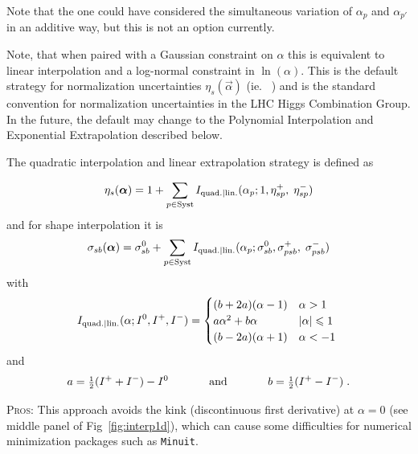 Note that the one could have considered the simultaneous variation of $\alpha_{p}$ and $\alpha_{p'}$ in an additive way, but this is not an option currently.

Note, that when paired with a Gaussian constraint on $\alpha$ this is equivalent to  linear interpolation and a log-normal constraint in $\ln(\alpha)$.  This is the default strategy for normalization uncertainties $\eta_{s}(\vec{\alpha})$ (ie. \OS\ ) and is the standard convention for normalization uncertainties in the LHC Higgs Combination Group.  In the future, the default may change to the Polynomial Interpolation and Exponential Extrapolation described below.


The quadratic interpolation and linear extrapolation strategy is defined as

\begin{equation}
\eta_s ({\boldsymbol \alpha}) = 1+\sum_{p\in\textrm{Syst}} I_{\rm quad.|lin.}(\alpha_p; 1, \eta_{sp}^+, \; \eta_{sp}^- ) 
\end{equation}
and for shape interpolation it is
\begin{equation}
\sigma_{sb} ({\boldsymbol \alpha}) = \sigma_{sb}^0 + \sum_{p\in\textrm{Syst}} I_{\rm quad.|lin.}(\alpha_p;  \sigma_{sb}^0, \sigma_{psb}^+ ,\;
\sigma_{psb}^- )  
\end{equation}
 with
\begin{equation}
 I_{\rm quad.|lin.}(\alpha;  I^0, I^+,I^- ) =
 \begin{cases}
   (b+2a)(\alpha-1)  &  \text{$\alpha>1$} \\
     a\alpha^2 + b\alpha                        &  \text{$|\alpha|\le1$} \\
     (b-2a)(\alpha+1)  &  \text{$\alpha<-1$ }
 \end{cases}
\end{equation}
and 
\begin{eqnarray}
a = \half (I^+ + I^-) -I^0 \hspace{.5in} \textrm{and} \hspace{.5in} b= \half(I^+ - I^-) \; .
\end{eqnarray}


\textsc{Pros:} This approach avoids the kink (discontinuous first derivative) at $\alpha=0$ (see middle panel of Fig~\ref{fig:interp1d}), which can cause some difficulties for numerical minimization packages such as \texttt{Minuit}.

